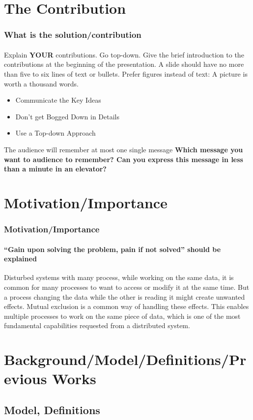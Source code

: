 \documentclass[11pt]{beamer}              %
\begin{document}
\section{The Contribution}
\begin{frame}
\frametitle{What is the solution/contribution}
\framesubtitle{}
Explain \textbf{YOUR} contributions. Go top-down. Give the brief introduction to the contributions at the beginning of the presentation. A slide should have no more than five to six lines of text or bullets. Prefer figures instead of text: A picture is worth a thousand words.
\begin{itemize}
\item Communicate the Key Ideas
\item Don’t get Bogged Down in Details
\item Use a Top-down Approach
\end{itemize}

The audience will remember at most one single message \textbf{Which message you want to audience to remember? Can you express this message in less than a minute in an elevator?}

\end{frame}


\section{Motivation/Importance}
\begin{frame}
\frametitle{Motivation/Importance}
\framesubtitle{``Gain upon solving the problem, pain if not solved'' should be explained}
Disturbed systems with many process, while working on the same data, it is common for many processes to want to access or modify it at the same time. But a process changing the data while the other is reading it might create unwanted effects. Mutual exclusion is a common way of handling these effects. This enables multiple processes to work on the same piece of data, which is one of the most fundamental capabilities requested from a distributed system.
\end{frame}

\section{Background/Model/Definitions/Previous Works}


\subsection{Model, Definitions}
\end{document}
